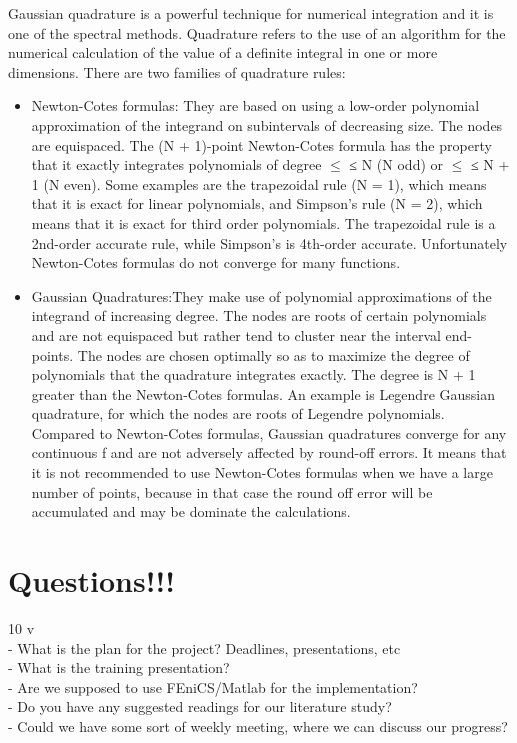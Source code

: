 \documentclass[a4paper,10pt,twoside]{article}
\begin{document}
Gaussian quadrature is a powerful technique for numerical integration and it is one of the spectral methods.
Quadrature refers to the use of an algorithm for the numerical calculation of
the value of a definite integral in one or more dimensions.
There are two families of quadrature rules:
\begin{itemize}
    \item Newton-Cotes formulas: They are based on using a low-order polynomial approximation of the
integrand on subintervals of decreasing size. The nodes are equispaced.
The (N + 1)-point Newton-Cotes formula has the property that it
exactly integrates polynomials of degree $\leq$ ≤ N (N odd) or $\leq$ ≤ N + 1 (N even). Some examples are the trapezoidal rule (N = 1), which means that it is exact for linear polynomials, and Simpson’s rule (N = 2), which means that it is exact for third order polynomials. The trapezoidal rule is a 2nd-order accurate rule, while Simpson’s is 4th-order accurate. 
Unfortunately Newton-Cotes formulas do not converge for many functions.  
    \item Gaussian Quadratures:They make use of polynomial approximations
of the integrand of increasing degree. The nodes are roots of certain polynomials and are not
equispaced but rather tend to cluster near the interval end-points. The nodes are chosen optimally
so as to maximize the degree of polynomials that the quadrature integrates exactly. The degree is N + 1 greater
than the Newton-Cotes formulas. An example is Legendre Gaussian
quadrature, for which the nodes are roots of Legendre
polynomials. Compared to Newton-Cotes formulas, Gaussian quadratures converge for any continuous f and are not adversely
affected by round-off errors. It means that it is not recommended to use Newton-Cotes formulas when we have a large number of points, because in that case the round off error will be accumulated and may be dominate the calculations.  
\end{itemize}
\section{Questions!!!}
10 v\\
- What is the plan for the project? Deadlines, presentations, etc\\
- What is the training presentation?\\
- Are we supposed to use FEniCS/Matlab for the implementation?\\
- Do you have any suggested readings for our literature study?\\
- Could we have some sort of weekly meeting, where we can discuss our progress?\\
\end{document}
